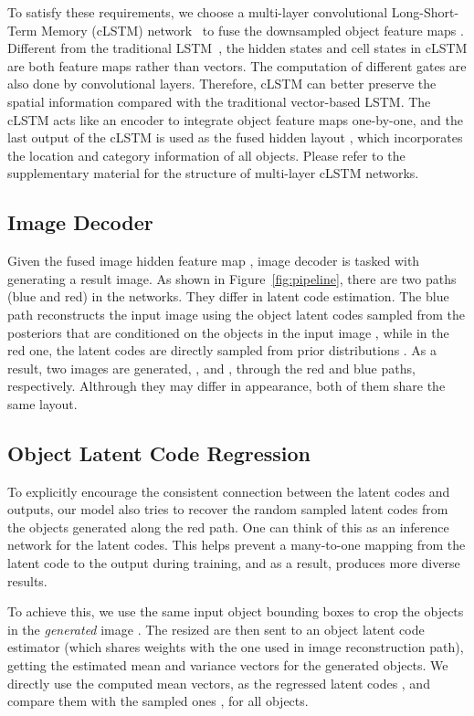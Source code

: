 \documentclass[10pt,twocolumn,letterpaper]{article}
\begin{document}
To satisfy these requirements, we choose a multi-layer convolutional Long-Short-Term Memory (cLSTM) network~\cite{Shi2015} to fuse the downsampled object feature maps . 
Different from the traditional LSTM~\cite{Hochreiter1997}, the hidden states and cell states in cLSTM are both feature maps rather than vectors. The computation of different gates are also done by convolutional layers. Therefore, cLSTM can better preserve the spatial information compared with the traditional vector-based LSTM.  
The cLSTM acts like an encoder to integrate object feature maps one-by-one, and the last output of the cLSTM is used as the fused hidden layout , which incorporates the location and category information of all objects. Please refer to the supplementary material for the structure of multi-layer cLSTM networks.

\subsection{Image Decoder}
Given the fused image hidden feature map , image decoder is tasked with generating a result image.
As shown in Figure~\ref{fig:pipeline}, there are two paths (blue and red) in the networks. They differ in latent code estimation. The blue path reconstructs the input image using the object latent codes  sampled from the posteriors  that are conditioned on the objects  in the input image , while in the red one, the latent codes  are directly sampled from prior distributions . 
As a result, two images are generated, \ie,  and , through the red and blue paths, respectively. Althrough they may differ in appearance, both of them share the same layout.





\subsection{Object Latent Code Regression}
To explicitly encourage the consistent connection between the latent codes and outputs, our model also tries to recover the random sampled latent codes from the objects generated along the red path. One can think of this as an inference network for the latent codes. This helps prevent a many-to-one mapping from the latent code to the output during training, and as a result, produces more diverse results.

To achieve this, we use the same input object bounding boxes  to crop the objects  in the {\em generated} image . 
The resized  are then sent to an object latent code estimator (which shares weights with the one used in image reconstruction path), getting the estimated mean and variance vectors for the generated objects. 
We directly use the computed mean vectors, as the regressed latent codes , and compare them with the sampled ones , for all objects. 
\end{document}
